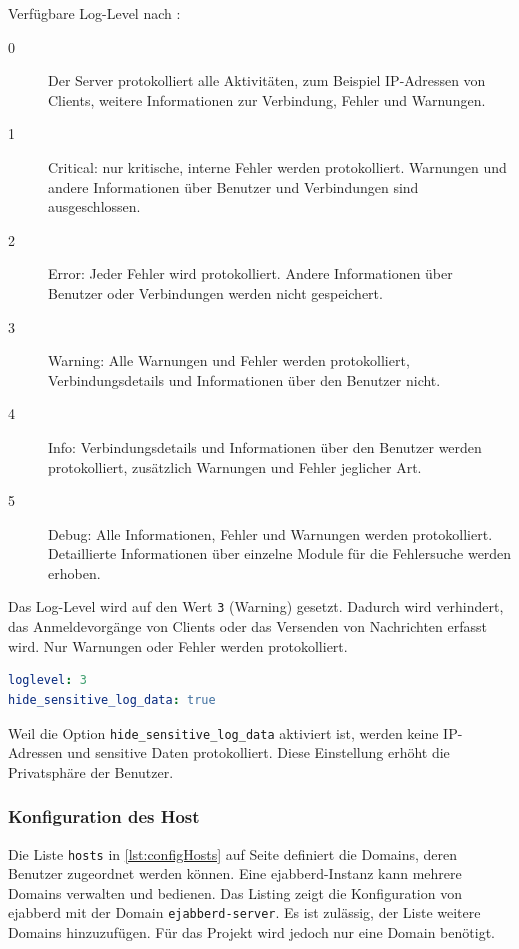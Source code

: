 \documentclass[a4paper,titlepage,halfparskip,12pt]{scrreprt}
\begin{document}
\begin{onehalfspacing}
Verfügbare Log-Level nach \cite{ejabberdDoc}:

\begin{description}
\item[0] Der Server protokolliert alle Aktivitäten, zum Beispiel IP-Adressen von Clients, weitere Informationen zur Verbindung, Fehler und Warnungen.
\item[1] Critical: nur kritische, interne Fehler werden protokolliert. Warnungen und andere Informationen über Benutzer und Verbindungen sind ausgeschlossen.
\item[2] Error: Jeder Fehler wird protokolliert. Andere Informationen über Benutzer oder Verbindungen werden nicht gespeichert.
\item[3] Warning: Alle Warnungen und Fehler werden protokolliert, Verbindungsdetails und Informationen über den Benutzer nicht.
\item[4] Info: Verbindungsdetails und Informationen über den Benutzer werden protokolliert, zusätzlich Warnungen und Fehler jeglicher Art.
\item[5] Debug: Alle Informationen, Fehler und Warnungen werden protokolliert. Detaillierte Informationen über einzelne Module für die Fehlersuche werden erhoben.
\end{description}

Das Log-Level wird auf den Wert \texttt{3} (Warning) gesetzt. Dadurch wird verhindert, das Anmeldevorgänge von Clients oder das Versenden von Nachrichten erfasst wird. Nur Warnungen oder Fehler werden protokolliert.\cite{ejabberdDoc}

\bigskip

\begin{lstlisting}[language=yaml, caption={Einstellung für das Log-Level von ejabberd}]
loglevel: 3
hide_sensitive_log_data: true
\end{lstlisting}

Weil die Option \texttt{hide\_sensitive\_log\_data} aktiviert ist, werden keine IP-Adressen und sensitive Daten protokolliert. Diese Einstellung erhöht die Privatsphäre der Benutzer.\cite{ejabberdDoc}

\subsubsection*{Konfiguration des Host}

Die Liste \texttt{hosts} in \autoref{lst:configHosts} auf Seite \pageref{lst:configHosts} definiert die Domains, deren Benutzer zugeordnet werden können. Eine ejabberd-Instanz kann mehrere Domains verwalten und bedienen. Das Listing zeigt die Konfiguration von ejabberd mit der Domain \texttt{ejabberd-server}. Es ist zulässig, der Liste weitere Domains hinzuzufügen. Für das Projekt wird jedoch nur eine Domain benötigt.


\end{onehalfspacing}
\end{document}

